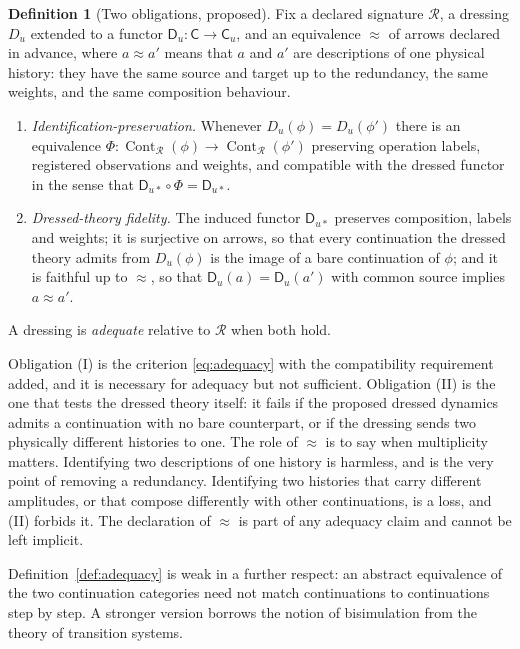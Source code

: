 \documentclass[11pt]{article}
\theoremstyle{plain}
\theoremstyle{definition}
\newtheorem{definition}{Definition}
\theoremstyle{remark}
\newcommand{\R}{\mathcal R}
\newcommand{\Cont}{\operatorname{Cont}}
\begin{document}
\begin{definition}[Two obligations, proposed]\label{def:twoobl}
Fix a declared signature $\R$, a dressing $D_u$ extended to a functor $\mathsf D_u:\mathsf C\to\mathsf C_u$, and an equivalence $\approx$ of arrows declared in advance, where $a\approx a'$ means that $a$ and $a'$ are descriptions of one physical history: they have the same source and target up to the redundancy, the same weights, and the same composition behaviour.
\begin{enumerate}[label=(\Roman*)]
\item \emph{Identification-preservation.} Whenever $D_u(\phi)=D_u(\phi')$ there is an equivalence $\Phi:\Cont_\R(\phi)\to\Cont_\R(\phi')$ preserving operation labels, registered observations and weights, and compatible with the dressed functor in the sense that $\mathsf D_{u*}\circ\Phi=\mathsf D_{u*}$.
\item \emph{Dressed-theory fidelity.} The induced functor $\mathsf D_{u*}$ preserves composition, labels and weights; it is surjective on arrows, so that every continuation the dressed theory admits from $D_u(\phi)$ is the image of a bare continuation of $\phi$; and it is faithful up to $\approx$, so that $\mathsf D_u(a)=\mathsf D_u(a')$ with common source implies $a\approx a'$.
\end{enumerate}
A dressing is \emph{adequate} relative to $\R$ when both hold.
\end{definition}

Obligation (I) is the criterion \eqref{eq:adequacy} with the compatibility requirement added, and it is necessary for adequacy but not sufficient. Obligation (II) is the one that tests the dressed theory itself: it fails if the proposed dressed dynamics admits a continuation with no bare counterpart, or if the dressing sends two physically different histories to one. The role of $\approx$ is to say when multiplicity matters. Identifying two descriptions of one history is harmless, and is the very point of removing a redundancy. Identifying two histories that carry different amplitudes, or that compose differently with other continuations, is a loss, and (II) forbids it. The declaration of $\approx$ is part of any adequacy claim and cannot be left implicit.

Definition~\ref{def:adequacy} is weak in a further respect: an abstract equivalence of the two continuation categories need not match continuations to continuations step by step. A stronger version borrows the notion of bisimulation from the theory of transition systems.
\end{document}
